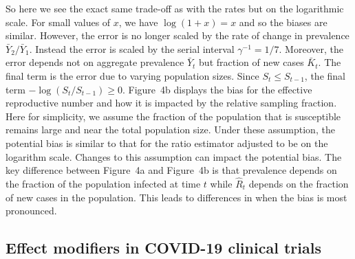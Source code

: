 \documentclass[12pt]{article}
\begin{document}
So here we see the exact same trade-off as with the rates but on the logarithmic scale.  For small values of $x$, we have $\log(1+x) = x$ and so the biases are similar.  However, the error is no longer scaled by the rate of change in prevalence $\bar Y_2/\bar Y_1$. Instead the error is scaled by the serial interval $\gamma^{-1} = 1/7$.  Moreover, the error depends not on aggregate prevalence $\bar Y_t$ but fraction of new cases $\bar K_t$. The final term is the error due to varying population sizes.  Since $S_t \leq S_{t-1}$, the final term $- \log (S_t/S_{t-1}) \geq 0$. Figure~4b displays the bias for the effective reproductive number and how it is impacted by the relative sampling fraction.  Here for simplicity, we assume the fraction of the population that is susceptible remains large and near the total population size.  Under these assumption, the potential bias is similar to that for the ratio estimator adjusted to be on the logarithm scale.  Changes to this assumption can impact the potential bias.  The key difference between Figure~4a and Figure~4b is that prevalence depends on the fraction of the population infected at time $t$ while $\hat R_t$ depends on the fraction of new cases in the population. This leads to differences in when the bias is most pronounced.

\subsection*{Effect modifiers in COVID-19 clinical trials}
\end{document}
